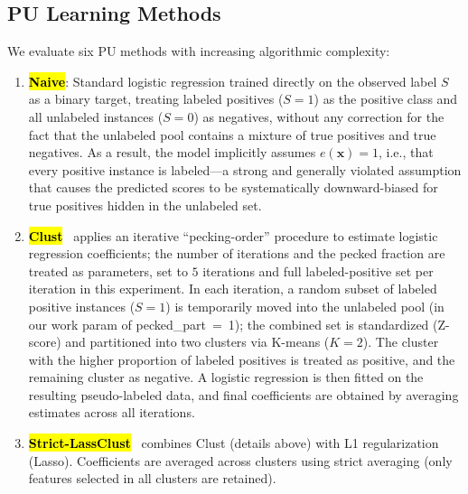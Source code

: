 \documentclass[applsci,article,accept,pdftex,moreauthors]{Definitions/mdpi}
\begin{document}
\subsection{PU Learning Methods}

We evaluate six PU methods with increasing algorithmic complexity:

\begin{enumerate}
\item \textbf{\hl{Naive}}: Standard logistic regression trained directly on the observed label $S$ as a binary target, treating labeled positives ($S=1$) as the positive class and all unlabeled instances ($S=0$) as negatives, without any correction for the fact that the unlabeled pool contains a mixture of true positives and true negatives. As a result, the model implicitly assumes $e(\mathbf{x}) = 1$, i.e., that every positive instance is labeled---a strong and generally violated assumption that causes the predicted scores to be systematically downward-biased for true positives hidden in the unlabeled set.

\item \textbf{\hl{Clust}}~\cite{mdai25_mvc} applies an iterative ``pecking-order'' procedure to estimate logistic regression coefficients; the number of iterations and the pecked fraction are treated as parameters, set to $5$ iterations and full labeled-positive set per iteration in this experiment. In each iteration, a random subset of labeled positive instances ($S=1$) is temporarily moved into the unlabeled pool (in our work param of \mbox{pecked\_part = 1);} the combined set is standardized (Z-score) and partitioned into two clusters via \mbox{K-means} ($K=2$). The cluster with the higher proportion of labeled positives is treated as positive, and the remaining cluster as negative. A logistic regression is then fitted on the resulting pseudo-labeled data, and final coefficients are obtained by averaging estimates across all iterations.

\item \textbf{\hl{Strict-LassClust}}~\cite{mdai25_mvc} combines Clust (details above) with L1 regularization (Lasso). Coefficients are averaged across clusters using strict averaging (only features selected in all clusters are retained).


\end{enumerate}
\end{document}
